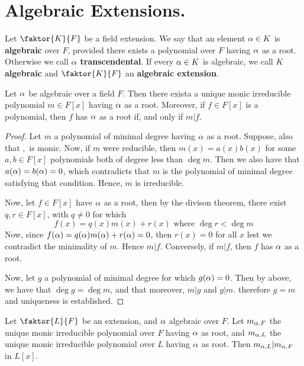 \section{Algebraic Extensions.}

\begin{definition}
    Let $\faktor{K}{F}$ be a field extension. We say that an element $\alpha \in K$
    is  \textbf{algebraic} over $F$, provided there exists a polynomial over $F$
    having $\alpha$ as a root. Otherwise we call $\alpha$  \textbf{transcendental}. If
    every $\alpha \in K$ is algebraic, we call $K$ \textbf{algebraic} and
    $\faktor{K}{F}$ an \textbf{algebraic extension}.
\end{definition}

\begin{lemma}\label{1.2.1}
    Let $\alpha$ be algebraic over a field  $F$. Then there exista a unique monic
    irreducible polynomial  $m \in F[x]$ having $\alpha$ as a root. Moreover, if  $f
    \in F[x]$ is a polynomial, then $f$ has $\alpha$ as a root if, and only if $m|f$.
\end{lemma}
\begin{proof}
    Let $m$ a polynomial of minimal degree having  $\alpha$ as a root. Suppose, also
    that  $,$ is monic. Now, if  $m$ were reducible, then $m(x)=a(x)b(x)$ for
    some $a,b \in F[x]$ polynomials both of degree less than $\deg{m}$. Then we
    also have that $a(\alpha)=b(\alpha)=0$, which contradicts that $m$ is the polynomial
    of minimal degree satisfying that condition. Hence,  $m$ is irreducible.

    Now, let  $f \in F[x]$ have $\alpha$ as a root, then by the divison theorem,
    there exist  $q,r \in F[x]$, with $q \neq 0$ for which
    \begin{equation*}
        f(x)=q(x)m(x)+r(x) \text{ where } \deg{r}<\deg{m}
    \end{equation*}
    Now, since $f(\alpha)=q(\alpha)m(\alpha)+r(\alpha)=0$, then $r(x)=0$ for all $x$ lest we
    contradict the minimality of $m$. Hence $m|f$. Conversely, if $m|f$, then
    $f$ has $\alpha$ as a root.

    Now, let $g$ a polynomial of minimal degree for which  $g(\alpha)=0$. Then by
    above, we have that $\deg{g}=\deg{m}$, and that moreover, $m|g$ and  $g|m$.
    therefore  $g=m$ and uniqueness is established.
\end{proof}
\begin{corollary}
    Let $\faktor{L}{F}$ be an extension, and $\alpha$ algebraic over $F$. Let
    $m_{\alpha,F}$ the unique monic irreducible polynomial over $F$ having  $\alpha$ as
    root, and  $m_{\alpha,L}$ the unique monic irreducible polynomial over $L$
    having  $\alpha$ as root. Then $m_{\alpha,L}|m_{\alpha,F}$ in $L[x]$.
\end{corollary}

